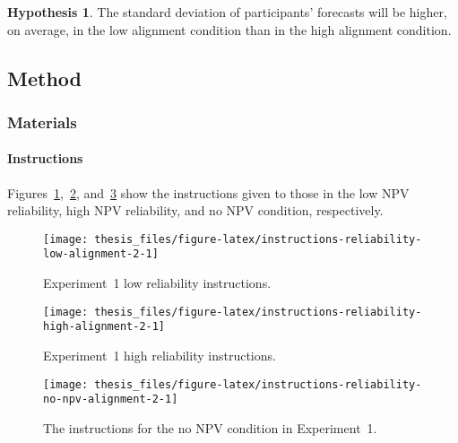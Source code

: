 \documentclass[a4paper, nobind]{templates/ociamthesis}
\theoremstyle{definition}
\theoremstyle{definition}
\theoremstyle{definition}
\theoremstyle{definition}
\newtheorem{hypothesis}{Hypothesis}[chapter]
\theoremstyle{remark}
\begin{document}
\begin{hypothesis}
\protect\hypertarget{hyp:forecasting-sd-alignment-alignment-2}{}{\label{hyp:forecasting-sd-alignment-alignment-2} }The standard deviation of participants' forecasts will be higher, on average,
in the low alignment condition than in the high alignment condition.
\end{hypothesis}

\subsection{Method}

\hypertarget{materials-alignment-2-appendix}{%
\subsubsection{Materials}\label{materials-alignment-2-appendix}}

\hypertarget{instructions-materials-alignment-2-appendix}{%
\paragraph{Instructions}\label{instructions-materials-alignment-2-appendix}}

Figures~\ref{fig:instructions-reliability-low-alignment-2},~\ref{fig:instructions-reliability-high-alignment-2},
and~\ref{fig:instructions-reliability-no-npv-alignment-2} show the instructions
given to those in the low NPV reliability, high NPV reliability, and no NPV
condition, respectively.



\begin{figure}
\texttt{[image: thesis\_files/figure-latex/instructions-reliability-low-alignment-2-1]} \caption{Experiment~1 low reliability instructions.}\label{fig:instructions-reliability-low-alignment-2}
\end{figure}



\begin{figure}
\texttt{[image: thesis\_files/figure-latex/instructions-reliability-high-alignment-2-1]} \caption{Experiment~1 high reliability instructions.}\label{fig:instructions-reliability-high-alignment-2}
\end{figure}



\begin{figure}
\texttt{[image: thesis\_files/figure-latex/instructions-reliability-no-npv-alignment-2-1]} \caption{The instructions for the no NPV condition in Experiment~1.}\label{fig:instructions-reliability-no-npv-alignment-2}
\end{figure}
\end{document}
